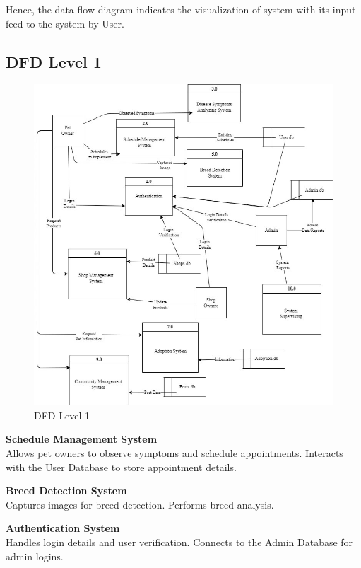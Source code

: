     \noindent Hence, the data flow diagram indicates the visualization of system with its input feed to the system by User.\\


    \subsection{DFD Level 1}
    \vspace{2cm}
    \begin{figure}[H]
    \centering
    \includegraphics[width=0.95\linewidth]{img/dfd_1.jpg}
    \caption[DFD Level 1]{DFD Level 1}
    \label{fig:dfd-level1}
    \end{figure}
    \textbf{Schedule Management System}\\
        Allows pet owners to observe symptoms and schedule appointments.
        Interacts with the User Database to store appointment details.
    
    \noindent\textbf{Breed Detection System}\\
        Captures images for breed detection.
        Performs breed analysis.
    
        \noindent\textbf{Authentication System}\\
        Handles login details and user verification.
        Connects to the Admin Database for admin logins.
    
